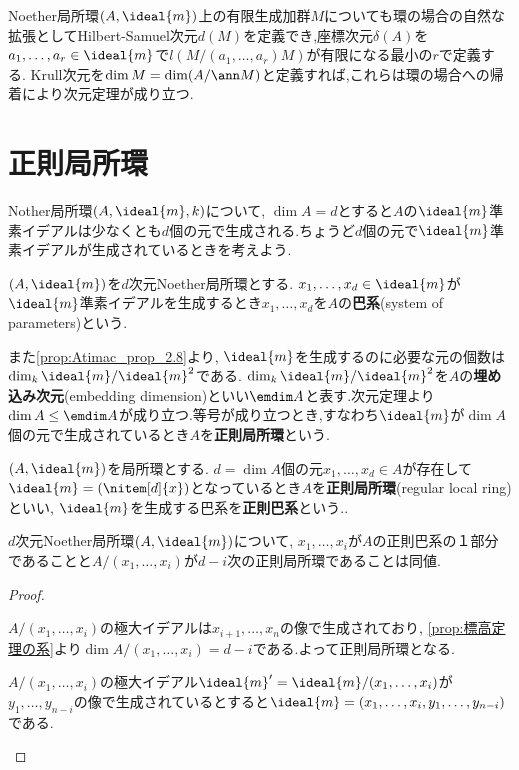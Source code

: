 Noether局所環$(A,\ideal{m})$上の有限生成加群$M$についても環の場合の自然な拡張としてHilbert-Samuel次元$d(M)$を定義でき,座標次元$\delta(A)$を$a_1,\dots,a_r\in\ideal{m}$で$l(M/(a_1,\dots,a_r)M)$が有限になる最小の$r$で定義する. Krull次元を$\dim M=\dim(A/\ann M)$と定義すれば,これらは環の場合への帰着により次元定理が成り立つ.

\section{正則局所環}

Nother局所環$(A,\ideal{m},k)$について, $\dim A=d$とすると$A$の$\ideal{m}$準素イデアルは少なくとも$d$個の元で生成される.ちょうど$d$個の元で$\ideal{m}$準素イデアルが生成されているときを考えよう.
\begin{defi}[巴系]
	$(A,\ideal{m})$を$d$次元Noether局所環とする. $x_1,\dots,x_d\in\ideal{m}$が$\ideal{m}$準素イデアルを生成するとき$x_1,\dots,x_d$を$A$の\textbf{巴系}(system of parameters)という.
\end{defi}

また\ref{prop:Atimac_prop_2.8}より, $\ideal{m}$を生成するのに必要な元の個数は$\dim_k\ideal{m}/\ideal{m}^2$である. $\dim_k\ideal{m}/\ideal{m}^2$を$A$の\textbf{埋め込み次元}(embedding dimension)といい$\emdim A$と表す.次元定理より$\dim A\leq\emdim A$が成り立つ.等号が成り立つとき,すなわち$\ideal{m}$が$\dim A$個の元で生成されているとき$A$を\textbf{正則局所環}という.

\begin{defi}[正則局所環]
	$(A,\ideal{m})$を局所環とする. $d=\dim A$個の元$x_1,\dots,x_d\in A$が存在して$\ideal{m}=(\nitem[d]{x})$となっているとき$A$を\textbf{正則局所環}(regular local ring)といい, $\ideal{m}$を生成する巴系を\textbf{正則巴系}という..
\end{defi}

\begin{prop}
$d$次元Noether局所環$(A,\ideal{m})$について, $x_1,\dots,x_i$が$A$の正則巴系の１部分であることと$A/(x_1,\dots,x_i)$が$d-i$次の正則局所環であることは同値.
\end{prop}

\begin{proof}
	\begin{eqv}
		\item $A/(x_1,\dots,x_i)$の極大イデアルは$x_{i+1},\dots,x_n$の像で生成されており, \ref{prop:標高定理の系}より$\dim A/(x_1,\dots,x_i)=d-i$である.よって正則局所環となる.
		
		\item $A/(x_1,\dots,x_i)$の極大イデアル$\ideal{m}'=\ideal{m}/(x_1,\dots,x_i)$が$y_1,\dots,y_{n-i}$の像で生成されているとすると$\ideal{m}=(x_1,\dots,x_i,y_1,\dots,y_{n-i})$である.
	\end{eqv}
\end{proof}

